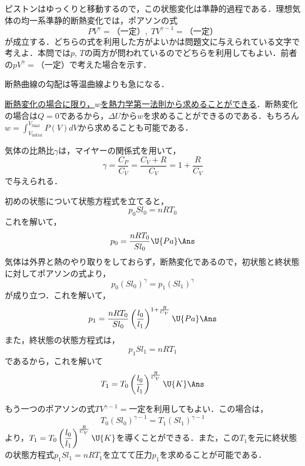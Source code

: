 \begin{multicols}{2}
\par\nopagebreak
\begin{sisin}
ピストンはゆっくりと移動するので，この状態変化は準静的過程である．理想気体の均一系準静的断熱変化では，ポアソンの式
\[PV^\gamma=（一定）,\;TV^{\gamma-1}=（一定）\]
が成立する．どちらの式を利用した方がよいかは問題文に与えられている文字で考えよ．本問では$p$, $T$の両方が問われているのでどちらを利用してもよい．前者の$pV^\gamma=（一定）$で考えた場合を示す．

断熱曲線の勾配は等温曲線よりも急になる．

\underline{断熱変化の}\hskip0pt\underline{場合に限}\hskip0pt\underline{り，$w$を}\hskip0pt\underline{熱力学第}\hskip0pt\underline{一法則か}\hskip0pt\underline{ら求める}\hskip0pt\underline{ことがで}\hskip0pt\underline{きる}．断熱変化の場合は$Q=0$であるから，$\Delta U$から$w$を求めることができるのである．もちろん$w=\displaystyle\int_{V_{\mathrm{initial}}}^{V_{\mathrm{final}}}P(V)dV$から求めることも可能である．
\end{sisin}
\KaiHead
気体の比熱比$\gamma$は，マイヤーの関係式を用いて，
\[\gamma=\frac{C_P}{C_V}=\frac{C_V+R}{C_V}=1+\frac{R}{C_V}\]
で与えられる．
\begin{komon}
 初めの状態について状態方程式を立てると，
       \[p_0Sl_0=nRT_0\]
       これを解いて，
       \[p_0=\frac{nRT_0}{Sl_0}\U{Pa}\Ans\]
 気体は外界と熱のやり取りをしておらず，断熱変化であるので，初状態と終状態に対してポアソンの式より，
       \[p_0(Sl_0)^\gamma=p_1(Sl_1)^\gamma\]
       が成り立つ．これを解いて，
       \[p_1=\frac{nRT_0}{Sl_0}\left(\frac{l_0}{l_1}\right)^{1+\frac{R}{C_V}}\U{Pa}\Ans\]
       また，終状態の状態方程式は，
       \[p_1Sl_1=nRT_1\]
       であるから，これを解いて
       \[T_1=T_0\left(\frac{l_0}{l_1}\right)^{\frac{R}{C_V}}\U{K}\Ans\]
       \begin{bekkai}
       もう一つのポアソンの式$TV^{\gamma-1}=$一定を利用してもよい．この場合は，
       \[T_0(Sl_0)^{\gamma-1}=T_1(Sl_1)^{\gamma-1}\]
       より，$T_1=T_0\left(\dfrac{l_0}{l_1}\right)^{\frac{R}{C_V}}\U{K}$を導くことができる．また，この$T_1$を元に終状態の状態方程式$p_1Sl_1=nRT_1$を立てて圧力$p_1$を求めることが可能である．


\end{bekkai}
\end{komon}
\end{multicols}
